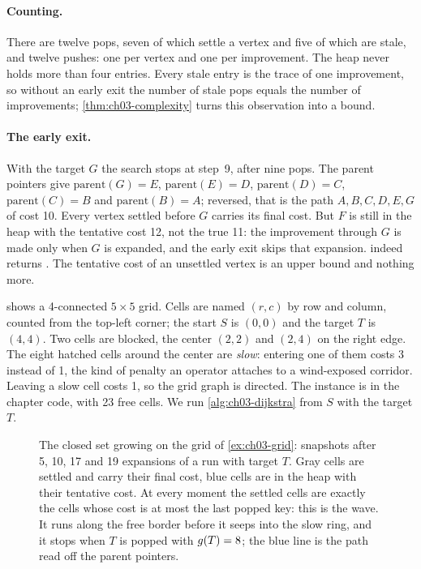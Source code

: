 \paragraph{Counting.} There are twelve pops, seven of which settle a vertex and five of which
are stale, and twelve pushes: one per vertex and one per improvement. The heap never holds
more than four entries. Every stale entry is the trace of one improvement, so without an early
exit the number of stale pops equals the number of improvements;
\cref{thm:ch03-complexity} turns this observation into a bound.

\paragraph{The early exit.} With the target $G$ the search stops at step~9, after nine pops.
The parent pointers give $\mathrm{parent}(G)=E$, $\mathrm{parent}(E)=D$,
$\mathrm{parent}(D)=C$, $\mathrm{parent}(C)=B$ and $\mathrm{parent}(B)=A$; reversed, that is the
path $A,B,C,D,E,G$ of cost 10. Every vertex settled before $G$ carries its final cost. But $F$
is still in the heap with the tentative cost 12, not the true 11: the improvement through $G$
is made only when $G$ is expanded, and the early exit skips that expansion.
 indeed returns . The
tentative cost of an unsettled vertex is an upper bound and nothing more.

\begin{example}
\label{ex:ch03-grid}
 shows a 4-connected $5\times5$ grid. Cells are named $(r,c)$ by row
and column, counted from the top-left corner; the start $S$ is $(0,0)$ and the target $T$ is
$(4,4)$. Two cells are blocked, the center $(2,2)$ and $(2,4)$ on the right edge. The eight
hatched cells around the center are \emph{slow}: entering one of them costs 3 instead of 1, the
kind of penalty an operator attaches to a wind-exposed corridor. Leaving a slow cell costs 1,
so the grid graph is directed. The instance is  in the chapter code, with
23 free cells. We run \cref{alg:ch03-dijkstra} from $S$ with the target $T$.
\end{example}

\begin{figure}[tb]
  \centering
  \caption{The closed set growing on the grid of \cref{ex:ch03-grid}: snapshots after 5, 10, 17
and 19 expansions of a run with target $T$. Gray cells are settled and carry their final cost,
blue cells are in the heap with their tentative cost. At every moment the settled cells are
exactly the cells whose cost is at most the last popped key: this is the wave. It runs along
the free border before it seeps into the slow ring, and it stops when $T$ is popped with
$g(T)=8$; the blue line is the path read off the parent pointers.}
  \label{fig:ch03-grid-closed}
\end{figure}

